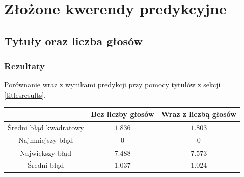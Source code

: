\documentclass{article}
\newcommand{\sql}[2]{

}
\begin{document}
{\section{Złożone kwerendy predykcyjne}

\subsection{Tytuły oraz liczba głosów}

\sql{Kwerenda łącząca tytuł oraz liczbę głosów wraz z ocenami}{./queries/titles-votes.sql}

\subsubsection{Rezultaty}

Porównanie wraz z wynikami predykcji przy pomocy tytułów z sekcji \ref{titlesresults}.


\begin{center}
\begin{tabular}{ |c|c|c| }
\hline  & Bez liczby głosów & Wraz z liczbą głosów \\
	\hline	Średni błąd kwadratowy & \( 1.836 \) & \( 1.803 \) \\
	\hline	Najmniejszy błąd & \( 0 \) & \( 0 \)\\
	\hline	Największy błąd & \( 7.488 \) & \( 7.573 \) \\
	\hline	Średni błąd & \( 1.037 \) & \( 1.024 \) \\
\hline
\end{tabular}
\end{center}

}
\end{document}

